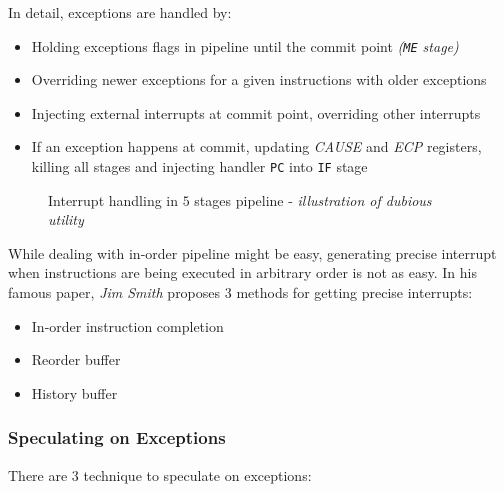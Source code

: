 \documentclass[english]{article}
\begin{document}
\bigskip
In detail, exceptions are handled by:

\begin{itemize}
  \item Holding exceptions flags in pipeline until the commit point \textit{(\texttt{ME} stage)}
  \item Overriding newer exceptions for a given instructions with older exceptions
  \item Injecting external interrupts at commit point, overriding other interrupts
  \item If an exception happens at commit, updating \textit{CAUSE} and \textit{ECP} registers, killing all stages and injecting handler \texttt{PC} into \texttt{IF} stage
\end{itemize}

\begin{figure}[htbp]
  \bigskip
  \centering
  \caption{Interrupt handling in \(5\) stages pipeline - \textit{illustration of dubious utility}}
  \label{fig:interrupt-handling-5-stages-pipeline}
  \bigskip
\end{figure}

While dealing with in-order pipeline might be easy, generating precise interrupt when instructions are being executed in arbitrary order is not as easy.
In his famous paper, \textit{Jim Smith} proposes \(3\) methods for getting precise interrupts:

\begin{itemize}
  \item In-order instruction completion
  \item Reorder buffer
  \item History buffer
\end{itemize}

\subsubsection{Speculating on Exceptions}

There are \(3\) technique to speculate on exceptions:
\end{document}
